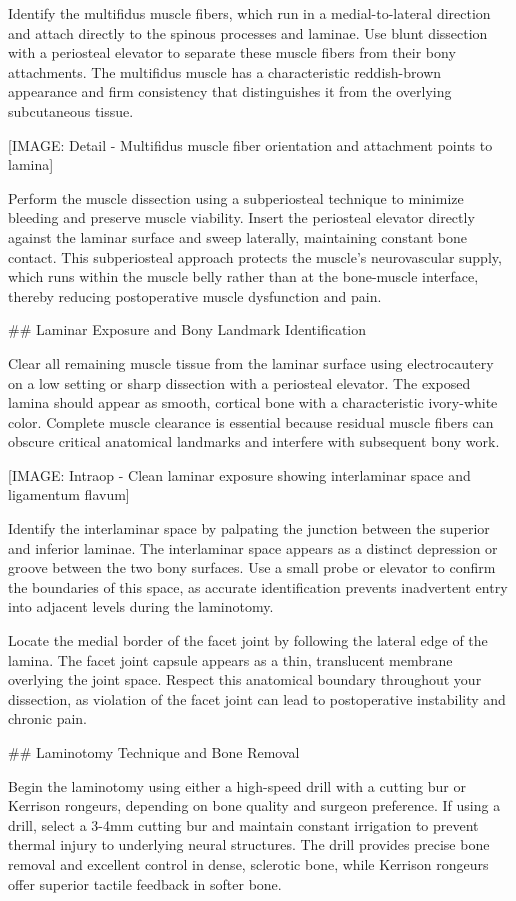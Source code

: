 \documentclass[12pt,a4paper]{article}
\begin{document}
Identify the multifidus muscle fibers, which run in a medial-to-lateral direction and attach directly to the spinous processes and laminae. Use blunt dissection with a periosteal elevator to separate these muscle fibers from their bony attachments. The multifidus muscle has a characteristic reddish-brown appearance and firm consistency that distinguishes it from the overlying subcutaneous tissue.

[IMAGE: Detail - Multifidus muscle fiber orientation and attachment points to lamina]

Perform the muscle dissection using a subperiosteal technique to minimize bleeding and preserve muscle viability. Insert the periosteal elevator directly against the laminar surface and sweep laterally, maintaining constant bone contact. This subperiosteal approach protects the muscle's neurovascular supply, which runs within the muscle belly rather than at the bone-muscle interface, thereby reducing postoperative muscle dysfunction and pain.

\#\# Laminar Exposure and Bony Landmark Identification

Clear all remaining muscle tissue from the laminar surface using electrocautery on a low setting or sharp dissection with a periosteal elevator. The exposed lamina should appear as smooth, cortical bone with a characteristic ivory-white color. Complete muscle clearance is essential because residual muscle fibers can obscure critical anatomical landmarks and interfere with subsequent bony work.

[IMAGE: Intraop - Clean laminar exposure showing interlaminar space and ligamentum flavum]

Identify the interlaminar space by palpating the junction between the superior and inferior laminae. The interlaminar space appears as a distinct depression or groove between the two bony surfaces. Use a small probe or elevator to confirm the boundaries of this space, as accurate identification prevents inadvertent entry into adjacent levels during the laminotomy.

Locate the medial border of the facet joint by following the lateral edge of the lamina. The facet joint capsule appears as a thin, translucent membrane overlying the joint space. Respect this anatomical boundary throughout your dissection, as violation of the facet joint can lead to postoperative instability and chronic pain.

\#\# Laminotomy Technique and Bone Removal

Begin the laminotomy using either a high-speed drill with a cutting bur or Kerrison rongeurs, depending on bone quality and surgeon preference. If using a drill, select a 3-4mm cutting bur and maintain constant irrigation to prevent thermal injury to underlying neural structures. The drill provides precise bone removal and excellent control in dense, sclerotic bone, while Kerrison rongeurs offer superior tactile feedback in softer bone.
\end{document}
